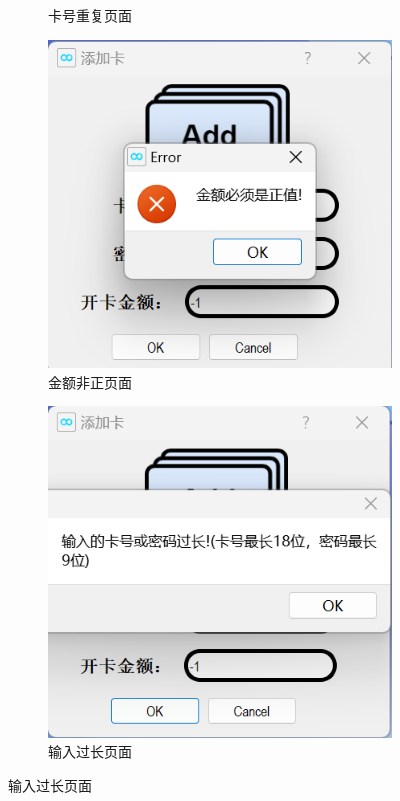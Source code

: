 \documentclass{article}
\begin{document}
\begin{figure}[htbp]
\begin{subfigure}{0.24\linewidth}
            \caption{卡号重复页面}
            \label{id_repeat}
        \end{subfigure}
        \centering
        \begin{subfigure}{0.24\linewidth}
            \centering
            \includegraphics[width=\linewidth]{figure/add_less_zero.png}
            \caption{金额非正页面}
            \label{add_less_zero}
        \end{subfigure}
        \centering
        \begin{subfigure}{0.24\linewidth}
            \centering
            \includegraphics[width=\linewidth]{figure/add_too_long.png}
            \caption{输入过长页面}
            \label{too_long}
        \end{subfigure}
    \end{figure}
\end{document}
